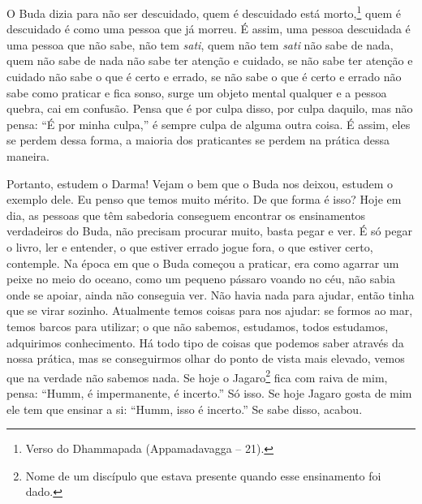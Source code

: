O Buda dizia para não ser descuidado, quem é descuidado está
morto,\footnote{Verso do Dhammapada (Appamadavagga – 21).} quem é
descuidado é como uma pessoa que já morreu. É assim, uma pessoa
descuidada é uma pessoa que não sabe, não tem \emph{sati}, quem não
tem \emph{sati} não sabe de nada, quem não sabe de nada não sabe ter
atenção e cuidado, se não sabe ter atenção e cuidado não sabe o que é
certo e errado, se não sabe o que é certo e errado não sabe como
praticar e fica sonso, surge um objeto mental qualquer e a pessoa
quebra, cai em confusão. Pensa que é por culpa disso, por culpa
daquilo, mas não pensa: “É por minha culpa,” é sempre culpa de alguma
outra coisa. É assim, eles se perdem dessa forma, a maioria dos
praticantes se perdem na prática dessa maneira. 

Portanto, estudem o Darma! Vejam o bem que o Buda nos deixou,
estudem o exemplo dele. Eu penso que temos muito mérito. De que forma é
isso? Hoje em dia, as pessoas que têm sabedoria conseguem encontrar os
ensinamentos verdadeiros do Buda, não precisam procurar muito, basta
pegar e ver. É só pegar o livro, ler e entender, o que estiver errado
jogue fora, o que estiver certo, contemple. Na época em que o Buda
começou a praticar, era como agarrar um peixe no meio do oceano, como
um pequeno pássaro voando no céu, não sabia onde se apoiar, ainda não
conseguia ver. Não havia nada para ajudar, então tinha que se virar
sozinho. Atualmente temos coisas para nos ajudar: se formos ao mar,
temos barcos para utilizar; o que não sabemos, estudamos, todos
estudamos, adquirimos conhecimento. Há todo tipo de coisas que podemos
saber através da nossa prática, mas se conseguirmos olhar do ponto de
vista mais elevado, vemos que na verdade não sabemos nada. Se hoje o
Jagaro\footnote{Nome de um discípulo que estava presente quando esse
ensinamento foi dado.} fica com raiva de mim, pensa: “Humm, é
impermanente, é incerto.” Só isso. Se hoje Jagaro gosta de mim ele tem
que ensinar a si: “Humm, isso é incerto.” Se sabe disso, acabou. 

